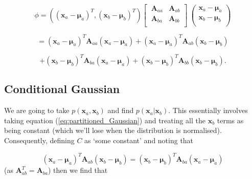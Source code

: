 \documentclass[a4paper, 11pt]{article}
\begin{document}
\begin{equation}
\phi = \left((\boldsymbol{x}_a-\boldsymbol{\mu}_a)^T, (\boldsymbol{x}_b-\boldsymbol{\mu}_b)^T \right)
\left[\
  \begin{array}{cc}
    \boldsymbol{A}_{aa} & \boldsymbol{A}_{ab} \\
    \boldsymbol{A}_{ba} & \boldsymbol{A}_{bb} \\
  \end{array}
\right]\
\left(
  \begin{array}{c}
    \boldsymbol{x}_a-\boldsymbol{\mu}_a \\
    \boldsymbol{x}_b-\boldsymbol{\mu}_b \\
  \end{array}
\right)
\end{equation}

\begin{equation*}
= (\boldsymbol{x}_a-\boldsymbol{\mu}_a)^T \boldsymbol{A}_{aa} (\boldsymbol{x}_a-\boldsymbol{\mu}_a) + (\boldsymbol{x}_a-\boldsymbol{\mu}_a)^T \boldsymbol{A}_{ab} (\boldsymbol{x}_b-\boldsymbol{\mu}_b)
\end{equation*}

\begin{equation}
+ (\boldsymbol{x}_b-\boldsymbol{\mu}_b)^T \boldsymbol{A}_{ba} (\boldsymbol{x}_a-\boldsymbol{\mu}_a) +
(\boldsymbol{x}_b-\boldsymbol{\mu}_b)^T \boldsymbol{A}_{bb} (\boldsymbol{x}_b-\boldsymbol{\mu}_b).
\label{eq:partitioned_Gaussian}
\end{equation}

\subsection{Conditional Gaussian}
We are going to take $p(\boldsymbol{x}_a,\boldsymbol{x}_b)$ and find $p(\boldsymbol{x}_a|\boldsymbol{x}_b)$. This essentially involves taking equation (\ref{eq:partitioned_Gaussian}) and treating all the $\boldsymbol{x}_b$ terms as being constant (which we'll lose when the distribution is normalised). Consequently, defining $C$ as `some constant' and noting that

\begin{equation}
(\boldsymbol{x}_a-\boldsymbol{\mu}_a)^T \boldsymbol{A}_{ab} (\boldsymbol{x}_b-\boldsymbol{\mu}_b) =
(\boldsymbol{x}_b-\boldsymbol{\mu}_b)^T \boldsymbol{A}_{ba} (\boldsymbol{x}_a-\boldsymbol{\mu}_a)
\end{equation}
(as $\boldsymbol{A}_{ab}^T=\boldsymbol{A}_{ba}$) then we find that
\end{document}
